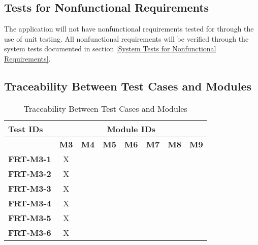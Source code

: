 \documentclass[12pt, titlepage]{article}
\begin{document}
\subsection{Tests for Nonfunctional Requirements}

The application will not have nonfunctional requirements tested for through the use of unit
testing. All nonfunctional requirements will be verified through the system tests documented in
section \ref{System Tests for Nonfunctional Requirements}.

\newpage

\subsection{Traceability Between Test Cases and Modules}

\begin{longtable}{|l|ccccccc|}
	\caption{Traceability Between Test Cases and Modules}                                                                                             \\
	\hline
	\textbf{Test IDs}  & \multicolumn{7}{c|}{\textbf{Module IDs}}                                                                                     \\
	\hline
	~                  & \textbf{M3}                              & \textbf{M4} & \textbf{M5} & \textbf{M6} & \textbf{M7} & \textbf{M8} & \textbf{M9} \\
	\hline
	\textbf{FRT-M3-1}  & X                                        & ~           & ~           & ~           & ~           & ~           & ~           \\
	\textbf{FRT-M3-2}  & X                                        & ~           & ~           & ~           & ~           & ~           & ~           \\
	\textbf{FRT-M3-3}  & X                                        & ~           & ~           & ~           & ~           & ~           & ~           \\
	\textbf{FRT-M3-4}  & X                                        & ~           & ~           & ~           & ~           & ~           & ~           \\
	\textbf{FRT-M3-5}  & X                                        & ~           & ~           & ~           & ~           & ~           & ~           \\
	\textbf{FRT-M3-6}  & X                                        & ~           & ~           & ~           & ~           & ~           & ~           \\

\end{longtable}
\end{document}
